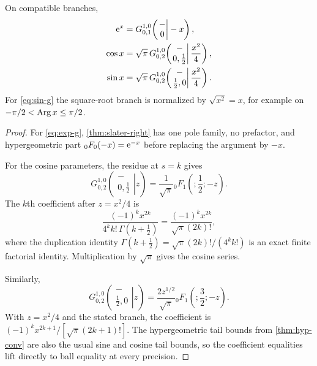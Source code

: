 \begin{theorem}\label{thm:exp-case}
On compatible branches,
\begin{align}
 \mathrm e^x
 &=G_{0,1}^{1,0}\!\left(\left.\begin{matrix}-\\0\end{matrix}\right|-x\right),
 \label{eq:exp-g}\\
 \cos x
 &=\sqrt\pi\,G_{0,2}^{1,0}\!\left(
       \left.\begin{matrix}-\\0,\frac12\end{matrix}\right|\frac{x^2}{4}\right),
 \label{eq:cos-g}\\
 \sin x
 &=\sqrt\pi\,G_{0,2}^{1,0}\!\left(
       \left.\begin{matrix}-\\\frac12,0\end{matrix}\right|\frac{x^2}{4}\right).
 \label{eq:sin-g}
\end{align}
For \eqref{eq:sin-g} the square-root branch is normalized by
$\sqrt{x^2}=x$, for example on $-\pi/2<\operatorname{Arg} x\le\pi/2$.
\end{theorem}
\begin{proof}
For \eqref{eq:exp-g}, \cref{thm:slater-right} has one pole family, no
prefactor, and hypergeometric part ${}_0F_0(-x)=\mathrm e^{-x}$ before replacing the
argument by $-x$.

For the cosine parameters, the residue at $s=k$ gives
\[
 G_{0,2}^{1,0}\!\left(
       \left.\begin{matrix}-\\0,\frac12\end{matrix}\right|z\right)
 =\frac1{\sqrt\pi}{}_0F_1\!\left(;\frac12;-z\right).
\]
The $k$th coefficient after $z=x^2/4$ is
\[
 \frac{(-1)^k x^{2k}}{4^k k!\,\Gamma(k+\frac12)}
 =\frac{(-1)^k x^{2k}}{\sqrt\pi(2k)!},
\]
where the duplication identity
$\Gamma(k+\frac12)=\sqrt\pi(2k)!/(4^k k!)$ is an exact finite factorial
identity.  Multiplication by $\sqrt\pi$ gives the cosine series.

Similarly,
\[
 G_{0,2}^{1,0}\!\left(
       \left.\begin{matrix}-\\\frac12,0\end{matrix}\right|z\right)
 =\frac{2z^{1/2}}{\sqrt\pi}{}_0F_1\!\left(;\frac32;-z\right).
\]
With $z=x^2/4$ and the stated branch, the coefficient is
$(-1)^kx^{2k+1}/[\sqrt\pi(2k+1)!]$.  The hypergeometric tail bounds from
\cref{thm:hyp-conv} are also the usual sine and cosine tail bounds, so the
coefficient equalities lift directly to ball equality at every precision.
\end{proof}

